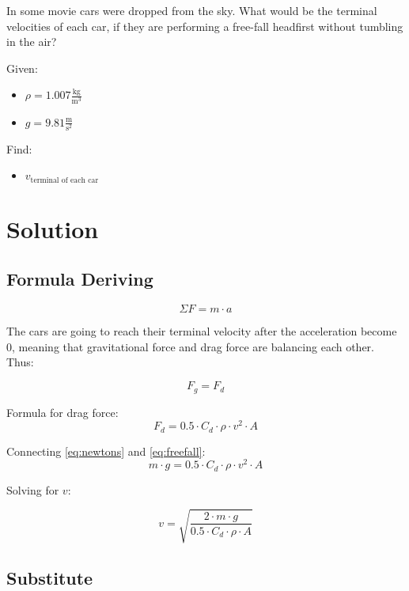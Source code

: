
In some movie cars were dropped from the sky.
What would be the terminal velocities of each car, if they are
performing a free-fall headfirst without tumbling in the air?

\bigbreak Given:
\begin{itemize}
    \item $ \rho = 1.007 \frac{\text{kg}}{\text{m}^3} $
    \item $ g = 9.81 \frac{\text{m}}{\text{s}^2} $
\end{itemize}

Find:
\begin{itemize}
    \item $ v_{\text{terminal of each car}} $
\end{itemize}


\section*{Solution}
\subsection*{Formula Deriving}

\begin{equation}
    \label{eq:newtons}
    \Sigma F = m \cdot a
\end{equation}

The cars are going to reach their terminal velocity after the acceleration become 0,
meaning that gravitational force and drag force are balancing each other. Thus:

$$ F_g = F_d $$

Formula for drag force:
\begin{equation}
    \label{eq:freefall}
    F_d = 0.5 \cdot C_d \cdot \rho \cdot v^2 \cdot A
\end{equation}

Connecting \ref{eq:newtons} and \ref{eq:freefall}:
$$m \cdot g = 0.5 \cdot C_d \cdot \rho \cdot v^2 \cdot A $$

Solving for $v$:

\begin{equation}
    \label{eq:terminal}
    v = \sqrt{\frac{2 \cdot m \cdot g}{0.5 \cdot C_d \cdot \rho \cdot A}}
\end{equation}

\subsection*{Substitute}

